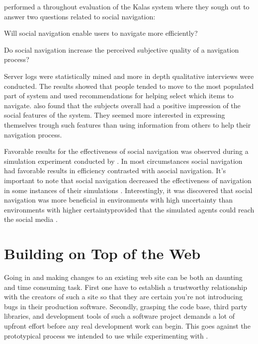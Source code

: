\citet{svensson05} performed a throughout evaluation of the Kalas system where
they sough out to answer two questions related to social navigation:

\begin{enum}
  \item Will social navigation enable users to navigate more efficiently?
  \item Do social navigation increase the perceived subjective quality of
    a navigation process?
\end{enum}

Server logs were statistically mined and more in depth qualitative interviews
were conducted. The results showed that people tended to move to the most
populated part of system and used recommendations for helping select which
items to navigate. \citeauthor{svensson05} also found that the subjects
overall had a positive impression of the social features of the system. They
seemed more interested in expressing themselves trough such features than
using information from others to help their navigation process.

Favorable results for the effectiveness of social navigation was observed
during a simulation experiment conducted by \citeauthor{riedl03}. In most
circumstances social navigation had favorable results in efficiency contrasted
with asocial navigation. It's important to note that social navigation
decreased the effectiveness of navigation in some instances of their
simulations \citeyearpar[]{riedl03}.
Interestingly, it was discovered that social navigation was more
beneficial in environments with high uncertainty%
than environments with higher certainty\dash{}provided that the
simulated agents could reach the social media
\citeyearpar[]{riedl03}. 

\section{Building on Top of the Web}
\label{section:building.on.top.of.the.web}

Going in and making changes to an existing web site can be both an
daunting and time consuming task. First one have to establish a trustworthy
relationship with the creators of such a site so that they are certain
you're not introducing bugs in their production software. Secondly, grasping
the code base, third party libraries, and development tools of such a software
project demands a lot of upfront effort before any real development work can
begin. This goes against the prototypical process we intended to use while
experimenting with \urort{}.

